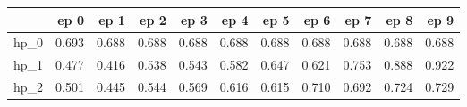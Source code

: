 \begin{tabular}{lrrrrrrrrrr}
\toprule
{} &   ep 0 &   ep 1 &   ep 2 &   ep 3 &   ep 4 &   ep 5 &   ep 6 &   ep 7 &   ep 8 &   ep 9 \\
\midrule
hp\_0 &  0.693 &  0.688 &  0.688 &  0.688 &  0.688 &  0.688 &  0.688 &  0.688 &  0.688 &  0.688 \\
hp\_1 &  0.477 &  0.416 &  0.538 &  0.543 &  0.582 &  0.647 &  0.621 &  0.753 &  0.888 &  0.922 \\
hp\_2 &  0.501 &  0.445 &  0.544 &  0.569 &  0.616 &  0.615 &  0.710 &  0.692 &  0.724 &  0.729 \\
\bottomrule
\end{tabular}

